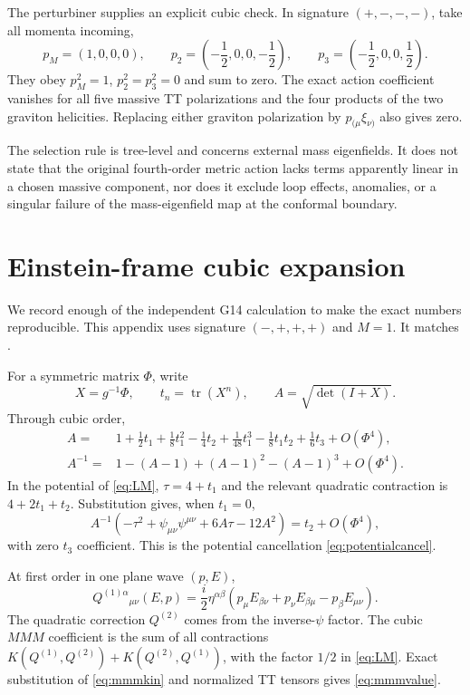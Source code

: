 \documentclass[11pt]{article}
\theoremstyle{definition}
\theoremstyle{remark}
\begin{document}
The perturbiner supplies an explicit cubic check.  In signature
$(+,-,-,-)$, take all momenta incoming,
\begin{equation}
p_M=(1,0,0,0),\qquad
p_2=\left(-\frac12,0,0,-\frac12\right),\qquad
p_3=\left(-\frac12,0,0,\frac12\right).
\end{equation}
They obey $p_M^2=1$, $p_2^2=p_3^2=0$ and sum to zero.  The exact action
coefficient vanishes for all five massive TT polarizations and the four
products of the two graviton helicities.  Replacing either graviton
polarization by $p_{(\mu}\xi_{\nu)}$ also gives zero.

The selection rule is tree-level and concerns external mass eigenfields.
It does not state that the original fourth-order metric action lacks
terms apparently linear in a chosen massive component, nor does it
exclude loop effects, anomalies, or a singular failure of the
mass-eigenfield map at the conformal boundary.

\section{Einstein-frame cubic expansion}
\label{app:eframe}

We record enough of the independent G14 calculation to make the exact
numbers reproducible.  This appendix uses signature $(-,+,+,+)$ and
$M=1$.  It matches
.

For a symmetric matrix $\Phi$, write
\begin{equation}
X=g^{-1}\Phi,\qquad
t_n=\operatorname{tr}(X^n),\qquad
A=\sqrt{\det(I+X)}.
\end{equation}
Through cubic order,
\begin{align}
A={}&1+\frac12t_1+\frac18t_1^2-\frac14t_2
+\frac1{48}t_1^3-\frac18t_1t_2+\frac16t_3+O(\Phi^4),\nonumber\\
A^{-1}={}&1-(A-1)+(A-1)^2-(A-1)^3+O(\Phi^4).
\end{align}
In the potential of \eqref{eq:LM}, $\tau=4+t_1$ and the relevant
quadratic contraction is $4+2t_1+t_2$.  Substitution gives, when
$t_1=0$,
\begin{equation}
A^{-1}\left(-\tau^2+\psi_{\mu\nu}\psi^{\mu\nu}
+6A\tau-12A^2\right)=t_2+O(\Phi^4),
\end{equation}
with zero $t_3$ coefficient.  This is the potential cancellation
\eqref{eq:potentialcancel}.

At first order in one plane wave $(p,E)$,
\begin{equation}
Q^{(1)\alpha}{}_{\mu\nu}(E,p)
=\frac{i}{2}\eta^{\alpha\beta}
\left(p_\mu E_{\beta\nu}+p_\nu E_{\beta\mu}
-p_\beta E_{\mu\nu}\right).
\end{equation}
The quadratic correction $Q^{(2)}$ comes from the inverse-$\psi$
factor.  The cubic $MMM$ coefficient is the sum of all contractions
$K(Q^{(1)},Q^{(2)})+K(Q^{(2)},Q^{(1)})$, with the factor $1/2$ in
\eqref{eq:LM}.  Exact substitution of \eqref{eq:mmmkin} and normalized
TT tensors gives \eqref{eq:mmmvalue}.
\end{document}
